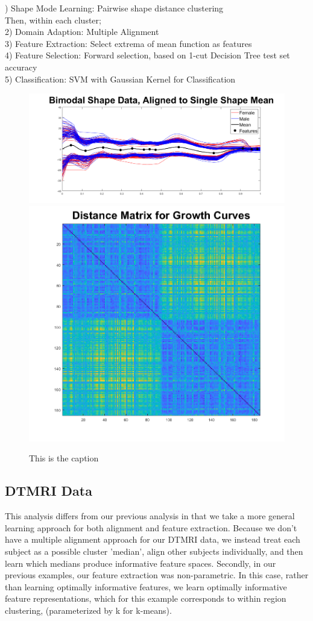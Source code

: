 \documentclass[]{article}
\begin{document}
) Shape Mode Learning: Pairwise shape distance clustering\\
Then, within each cluster;\\
2) Domain Adaption: Multiple Alignment\\
3) Feature Extraction: Select extrema of mean function as features\\
4) Feature Selection: Forward selection, based on 1-cut Decision Tree test set accuracy\\
5) Classification: SVM with Gaussian Kernel for Classification\\

\begin{figure}
	\includegraphics[width = .7\linewidth]{./Aligned_2_cluster.png}
	\includegraphics[width = .3\linewidth]{./Distance Matrix.png}
	\caption{This is the caption}
	\label{aligned function2}
\end{figure}

	

\subsection{DTMRI Data}\label{DTMRI}

This analysis differs from our previous analysis in that we take a more general learning approach for both alignment and feature extraction. Because we don't have a multiple alignment approach for our DTMRI data, we instead treat each subject as a possible cluster 'median', align other subjects individually, and then learn which medians produce informative feature spaces. Secondly, in our previous examples, our feature extraction was non-parametric. In this case, rather than learning optimally informative features, we learn optimally informative feature representations, which for this example corresponds to within region clustering, (parameterized by k for k-means).
\end{document}

